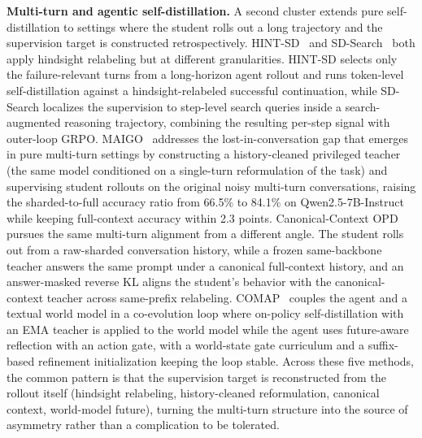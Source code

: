 \documentclass{article} %
\begin{document}
\textbf{Multi-turn and agentic self-distillation.} A second cluster extends pure self-distillation to settings where the student rolls out a long trajectory and the supervision target is constructed retrospectively. HINT-SD~\citep{2605.17873} and SD-Search~\citep{2605.18299} both apply hindsight relabeling but at different granularities. HINT-SD selects only the failure-relevant turns from a long-horizon agent rollout and runs token-level self-distillation against a hindsight-relabeled successful continuation, while SD-Search localizes the supervision to step-level search queries inside a search-augmented reasoning trajectory, combining the resulting per-step signal with outer-loop GRPO. MAIGO~\citep{2605.27186} addresses the lost-in-conversation gap that emerges in pure multi-turn settings by constructing a history-cleaned privileged teacher (the same model conditioned on a single-turn reformulation of the task) and supervising student rollouts on the original noisy multi-turn conversations, raising the sharded-to-full accuracy ratio from 66.5\% to 84.1\% on Qwen2.5-7B-Instruct while keeping full-context accuracy within 2.3 points. Canonical-Context OPD~\citep{2605.30251} pursues the same multi-turn alignment from a different angle. The student rolls out from a raw-sharded conversation history, while a frozen same-backbone teacher answers the same prompt under a canonical full-context history, and an answer-masked reverse KL aligns the student's behavior with the canonical-context teacher across same-prefix relabeling. COMAP~\citep{2606.02372} couples the agent and a textual world model in a co-evolution loop where on-policy self-distillation with an EMA teacher is applied to the world model while the agent uses future-aware reflection with an action gate, with a world-state gate curriculum and a suffix-based refinement initialization keeping the loop stable. Across these five methods, the common pattern is that the supervision target is reconstructed from the rollout itself (hindsight relabeling, history-cleaned reformulation, canonical context, world-model future), turning the multi-turn structure into the source of asymmetry rather than a complication to be tolerated.
\end{document}

